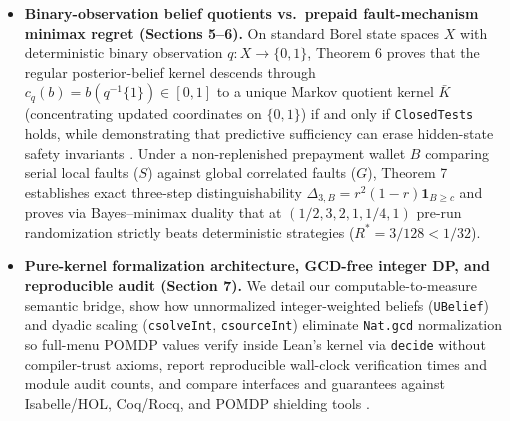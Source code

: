 \documentclass[11pt,a4paper]{article}
\begin{document}
\begin{itemize}
  \(J(\omega, h) = \mu(\omega) K_{s(\omega)}(h)\), verifying
  \texttt{NoisyFiniteRiskOracle} across \emph{all} candidate
  abstractions \(q_0, \dots, q_{m-1}\) on a single row-calibration event
  \(G_u\) \citep{hoeffding1963, mcdiarmid1989, pinsker1964} via Markov
  pushforward contractivity \citep{dobrushin1956, csiszar1975} without
  \(m\)-union penalties. Exact integer-binomial operating curves
  (\(u_N \propto N^{-1/2}\)) and a \(12\)-state multi-abstraction
  benchmark quantify compact \(4\)-state controllers and
  \(72\times\)--\(147\times\) faster macro-reference verification
  against microscopic \(\widehat{P}\) evaluation.
\item
  \textbf{Binary-observation belief quotients vs.~prepaid
  fault-mechanism minimax regret (Sections 5--6).} On standard Borel
  state spaces \(X\)
  \citep{giry1982, bertsekasShreve1978, hernandezLerma1996} with
  deterministic binary observation \(q: X \to \{0,1\}\), Theorem 6
  proves that the regular posterior-belief kernel descends through
  \(c_q(b) = b(q^{-1}\{1\}) \in [0,1]\) to a unique Markov quotient
  kernel \(\bar{K}\) (concentrating updated coordinates on \(\{0,1\}\))
  \citep{burkeRosenblatt1958, kemenySnell1960, larsenSkou1991, givanDeanGreig2003}
  if and only if \texttt{ClosedTests} holds, while demonstrating that
  predictive sufficiency can erase hidden-state safety invariants
  \citep{jaeger2000, littmanSuttonSingh2001}. Under a non-replenished
  prepayment wallet \(B\) \citep{altman1999, conantAshby1970, pearl2009}
  comparing serial local faults (\(S\)) against global correlated faults
  (\(G\)), Theorem 7 establishes exact three-step distinguishability
  \(\Delta_{3,B} = r^2(1-r)\mathbf{1}_{B \ge c}\)
  \citep{blackwell1953, coverThomas2006} and proves via Bayes--minimax
  duality \citep{bellman1957, blackwell1965, savage1951} that at
  \((1/2, 3, 2, 1, 1/4, 1)\) pre-run randomization strictly beats
  deterministic strategies (\(R^* = 3/128 < 1/32\)).
\item
  \textbf{Pure-kernel formalization architecture, GCD-free integer DP,
  and reproducible audit (Section 7).} We detail our
  computable-to-measure semantic bridge, show how unnormalized
  integer-weighted beliefs (\texttt{UBelief}) and dyadic scaling
  (\texttt{csolveInt}, \texttt{csourceInt}) eliminate \texttt{Nat.gcd}
  normalization so full-menu POMDP values verify inside Lean's kernel
  via \texttt{decide} without compiler-trust axioms, report reproducible
  wall-clock verification times and module audit counts, and compare
  interfaces and guarantees against Isabelle/HOL, Coq/Rocq, and POMDP
  shielding tools
  \citep{affeldt2014, eberl2015, hoelzlNipkow2012, hoelzl2017, vajjha2021, junges2021, carr2023, schaeffelerAbdulaziz2023}.
\end{itemize}
\end{document}
